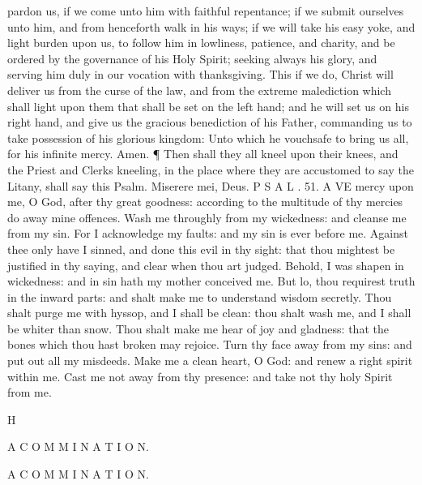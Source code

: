 pardon us, if we come unto him with faithful repentance; if we submit ourselves unto him, and from henceforth walk in his ways; if we will take his easy yoke, and light burden upon us, to follow him in lowliness, patience, and charity, and be ordered by the governance of his Holy Spirit; seeking always his glory, and serving him duly in our vocation with thanksgiving. This if we do, Christ will deliver us from the curse of the law, and from the extreme malediction which shall light upon them that shall be set on the left hand; and he will set us on his right hand, and give us the gracious benediction of his Father, commanding us to take possession of his glorious kingdom: Unto which he vouchsafe to bring us all, for his infinite mercy. Amen. ¶ Then shall they all kneel upon their knees, and the Priest and Clerks kneeling, in the place where they are accustomed to say the Litany, shall say this Psalm. Miserere mei, Deus. P S A L . 51. A VE mercy upon me, O God, after thy great goodness: according to the multitude of thy mercies do away mine offences. Wash me throughly from my wickedness: and cleanse me from my sin. For I acknowledge my faults: and my sin is ever before me. Against thee only have I sinned, and done this evil in thy sight: that thou mightest be justified in thy saying, and clear when thou art judged. Behold, I was shapen in wickedness: and in sin hath my mother conceived me. But lo, thou requirest truth in the inward parts: and shalt make me to understand wisdom secretly. Thou shalt purge me with hyssop, and I shall be clean: thou shalt wash me, and I shall be whiter than snow. Thou shalt make me hear of joy and gladness: that the bones which thou hast broken may rejoice. Turn thy face away from my sins: and put out all my misdeeds. Make me a clean heart, O God: and renew a right spirit within me. Cast me not away from thy presence: and take not thy holy Spirit from me.

H

A C O M M I N A T I O N.

A C O M M I N A T I O N.

